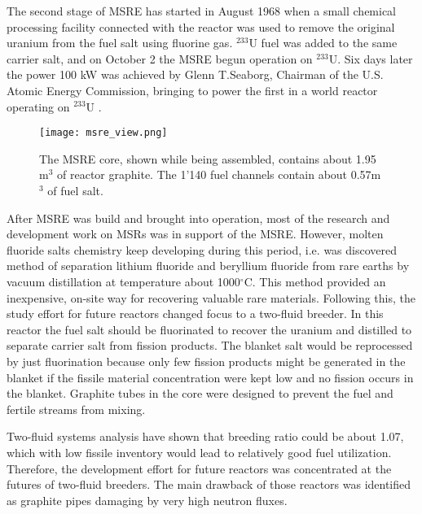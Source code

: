 The second stage of \gls{MSRE} has started in August 1968 when a small chemical processing facility connected with the reactor was used to remove the original uranium from the fuel salt using fluorine gas. $^{233}$U fuel was added to the same carrier salt, and on October 2 the \gls{MSRE} begun operation on $^{233}$U. Six days later the power 100 kW was achieved by Glenn T.Seaborg, Chairman of the U.S. Atomic Energy Commission, bringing to power the first in a world reactor operating on $^{233}$U \cite{haubenreich_experience_1970}.

\begin{figure}[htp!] %
  \centering
  \vspace{-0.3em}
  \texttt{[image: msre\_view.png]}
  \caption{The \gls{MSRE} core, shown while being assembled, contains about 1.95 m$^3$ of reactor graphite. The 1'140 fuel channels contain about 0.57m$^3$ of fuel salt.}
  \vspace{-0.6em}
  \label{fig:msre}
\end{figure}
\FloatBarrier

After \gls{MSRE} was build and brought into operation, most of the research and development work on \glspl{MSR} was in support of the \gls{MSRE}. However, molten fluoride salts chemistry keep developing during this period, i.e. was discovered method of separation lithium fluoride and beryllium fluoride from rare earths by vacuum distillation at temperature about 1000$^{\circ}$C. This method provided an inexpensive, on-site way for recovering valuable rare materials. Following this, the study effort for future reactors changed focus to a two-fluid breeder. In this reactor the fuel salt should be fluorinated to recover the uranium and distilled to separate carrier salt from fission products. The blanket salt would be reprocessed by just fluorination because only few fission products might be generated in the blanket if the fissile material concentration were kept low and no fission occurs in the blanket. Graphite tubes in the core were designed to prevent the fuel and fertile streams from mixing.

Two-fluid systems analysis have shown that breeding ratio could be about 1.07, which with low fissile inventory would lead to relatively good fuel utilization. Therefore, the development effort for future reactors was concentrated at the futures of two-fluid breeders. The main drawback of those reactors was identified as graphite pipes damaging by very high neutron fluxes.

